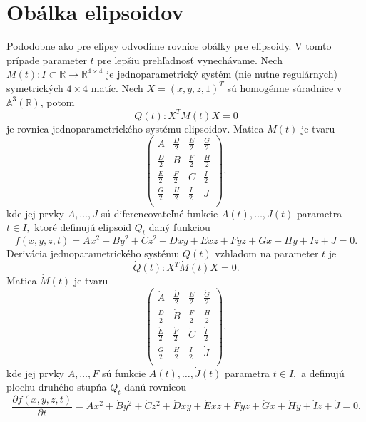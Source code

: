 \section{Obálka elipsoidov}
Pododobne ako pre elipsy odvodíme rovnice obálky pre elipsoidy. V tomto prípade parameter $t$ pre lepšiu prehľadnosť vynechávame.
Nech $M(t) \colon I \subset \mathbb{R} \rightarrow \mathbb{R}^{4 \times 4}$ je jednoparametrický systém (nie nutne regulárnych) symetrických $4 \times 4$ matíc. Nech $ X = (x, y, z, 1)^T$ sú homogénne súradnice v $\mathbb{A}^3(\mathbb{R})$, potom
\begin{equation*}
Q(t) \colon X^T M(t) X = 0
\end{equation*}
je rovnica jednoparametrického systému elipsoidov. Matica $M(t)$ je tvaru
$$
\left(\begin{matrix} 
A & \frac{D}{2} & \frac{E}{2} & \frac{G}{2} \\
\frac{D}{2} & B & \frac{F}{2} & \frac{H}{2} \\
\frac{E}{2} & \frac{F}{2} & C & \frac{I}{2} \\
\frac{G}{2} & \frac{H}{2} & \frac{I}{2} & J \\
\end{matrix} \right),
$$
kde jej prvky $A, \dots, J$ sú diferencovateľné funkcie $A(t), \dots, J(t)$ parametra $t \in I,$ ktoré definujú elipsoid $Q_t$ daný funkciou 
$$
f(x, y, z, t) = Ax^2 + By^2 + Cz^2 + Dxy + Exz + Fyz + Gx + Hy + Iz + J = 0.
$$
Derivácia jednoparametrického systému $Q(t)$ vzhľadom na parameter $t$ je 
\begin{equation*}
\dot{Q}(t) \colon X^T \dot{M}(t) X = 0.
\end{equation*}
Matica $\dot{M}(t)$ je tvaru
$$
\left(\begin{matrix} 
\dot{A} & \frac{\dot{D}}{2} & \frac{\dot{E}}{2} & \frac{\dot{G}}{2} \\
\frac{\dot{D}}{2} & \dot{B} & \frac{\dot{F}}{2} & \frac{\dot{H}}{2} \\
\frac{\dot{E}}{2} & \frac{\dot{F}}{2} & \dot{C} & \frac{\dot{I}}{2} \\
\frac{\dot{G}}{2} & \frac{\dot{H}}{2} & \frac{\dot{I}}{2} & \dot{J} \\
\end{matrix} \right),
$$
kde jej prvky $A, \dots, F$ sú funkcie $\dot{A}(t), \dots, \dot{J}(t)$ parametra $t \in I,$ a definujú plochu druhého stupňa $Q_t$ danú rovnicou 
$$\dfrac{\partial f(x, y, z, t)}{\partial t} = \dot{A}x^2 + \dot{B}y^2 + \dot{C}z^2 + \dot{D}xy + \dot{E}xz + \dot{F}yz + \dot{G}x + \dot{H}y + \dot{I}z + \dot{J} = 0.$$
